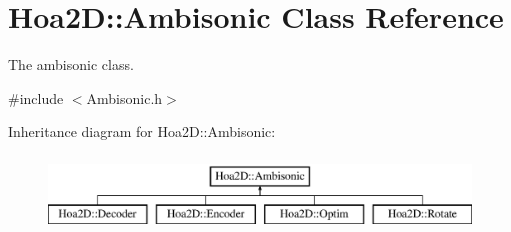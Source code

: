 \hypertarget{class_hoa2_d_1_1_ambisonic}{\section{Hoa2\-D\-:\-:Ambisonic Class Reference}
\label{class_hoa2_d_1_1_ambisonic}
}


The ambisonic class.  




{\ttfamily \#include $<$Ambisonic.\-h$>$}

Inheritance diagram for Hoa2\-D\-:\-:Ambisonic\-:\begin{figure}[H]
\begin{center}
\leavevmode
\includegraphics[height=2.000000cm]{class_hoa2_d_1_1_ambisonic}
\end{center}
\end{figure}
